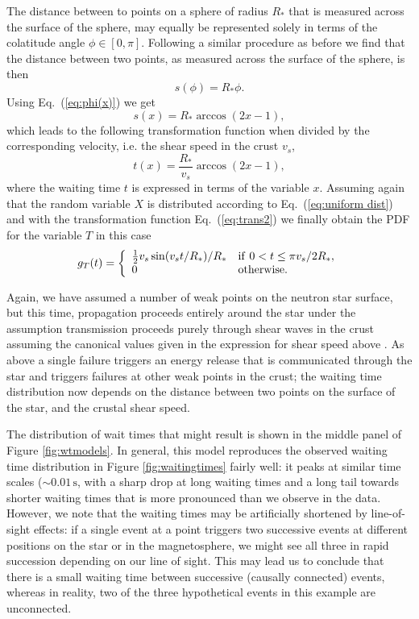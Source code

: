 \documentclass[12pt]{emulateapj}
\begin{document}
The distance between to points on a sphere of radius $R_*$ that is measured across the surface of the sphere, may equally be represented solely in terms of the colatitude angle $\phi\in[0,\pi]$. Following a similar procedure as before we find that the distance between two points, as measured across the surface of the sphere, is then
\begin{equation}\label{eq}
s(\phi)=R_*\phi.
\end{equation}
Using Eq.~(\ref{eq:phi(x)}) we get
\begin{equation}\label{eq}
s(x)=R_*\arccos(2x-1),
\end{equation}
which leads to the following transformation function when divided by the corresponding velocity, i.e. the shear speed in the crust $v_s$, 
\begin{equation}\label{eq:trans2}
t(x)=\frac{R_*}{v_s}\arccos\left(2x-1\right),
\end{equation}
where the waiting time $t$ is expressed in terms of the variable $x$. Assuming again that the random variable $X$ is distributed according to Eq.~(\ref{eq:uniform dist}) and with the transformation function Eq.~(\ref{eq:trans2}) we finally obtain the PDF for the variable $T$ in this case
\begin{equation}\label{eq}
g_T(t) = \left\{
\begin{array}{ll}
\frac{1}{2}v_s\sin(v_st/R_*)/R_* &  {\rm if~} 0<t\leq\pi v_s/2R_*,\\
0 & {\rm otherwise}.
\end{array} \right.
\end{equation}

Again, we have assumed a number of weak points on the neutron star surface, but this time, propagation proceeds entirely around the star under the assumption transmission proceeds purely through shear waves in the crust assuming the canonical values given in the expression for shear speed above .  As above a single failure triggers an energy release that is communicated through the star and triggers failures at other weak points in the crust; the waiting time distribution now depends on the distance between two points on the surface of the star, and the crustal shear speed. 

The distribution of wait times that might result is shown in the middle panel of Figure \ref{fig:wtmodels}.   In general, this model reproduces the observed waiting time distribution in Figure \ref{fig:waitingtimes} fairly well: it peaks at similar time scales ($\sim\!\! 0.01\,\mathrm{s}$, with a sharp drop at long waiting times and a long tail towards shorter waiting times that is more pronounced than we observe in the data. However, we note that the waiting times may be artificially shortened by line-of-sight effects: if a single event at a point triggers two successive events at different positions on the star or in the magnetosphere, we might see all three in rapid succession depending on our line of sight. This may lead us to conclude that there is a small waiting time between successive (causally connected) events, whereas in reality, two of the three hypothetical events in this example are unconnected.
\end{document}
